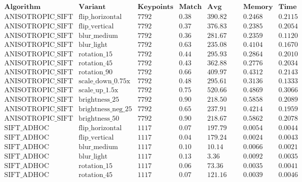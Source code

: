 \documentclass[conference]{IEEEtran}
\begin{document}
$$\begin{array}{|l|l|c|c|c|c|c|}
\hline
\textbf{Algorithm} & \textbf{Variant} & \textbf{Keypoints} & \textbf{Match Ratio} & \textbf{Avg Distance} & \textbf{Memory (MB)} & \textbf{Time (sec)} \\ \hline
\text{ANISOTROPIC\_SIFT} & \text{flip\_horizontal} & 7792 & 0.38 & 390.82 & 0.2468 & 0.2115 \\
\text{ANISOTROPIC\_SIFT} & \text{flip\_vertical} & 7792 & 0.37 & 376.83 & 0.2385 & 0.2054 \\
\text{ANISOTROPIC\_SIFT} & \text{blur\_medium} & 7792 & 0.36 & 281.67 & 0.2359 & 0.1120 \\
\text{ANISOTROPIC\_SIFT} & \text{blur\_light} & 7792 & 0.63 & 235.08 & 0.4104 & 0.1670 \\
\text{ANISOTROPIC\_SIFT} & \text{rotation\_15} & 7792 & 0.44 & 295.93 & 0.2864 & 0.2010 \\
\text{ANISOTROPIC\_SIFT} & \text{rotation\_45} & 7792 & 0.43 & 362.88 & 0.2776 & 0.2034 \\
\text{ANISOTROPIC\_SIFT} & \text{rotation\_90} & 7792 & 0.66 & 409.97 & 0.4312 & 0.2143 \\
\text{ANISOTROPIC\_SIFT} & \text{scale\_down\_0.75x} & 7792 & 0.48 & 295.61 & 0.3136 & 0.1333 \\
\text{ANISOTROPIC\_SIFT} & \text{scale\_up\_1.5x} & 7792 & 0.75 & 520.66 & 0.4869 & 0.3066 \\
\text{ANISOTROPIC\_SIFT} & \text{brightness\_25} & 7792 & 0.90 & 218.50 & 0.5858 & 0.2089 \\
\text{ANISOTROPIC\_SIFT} & \text{brightness\_neg\_25} & 7792 & 0.65 & 237.91 & 0.4214 & 0.1959 \\
\text{ANISOTROPIC\_SIFT} & \text{brightness\_50} & 7792 & 0.90 & 218.67 & 0.5862 & 0.2078 \\ \hline
\text{SIFT\_ADHOC} & \text{flip\_horizontal} & 1117 & 0.07 & 197.79 & 0.0054 & 0.0044 \\
\text{SIFT\_ADHOC} & \text{flip\_vertical} & 1117 & 0.04 & 179.24 & 0.0024 & 0.0043 \\
\text{SIFT\_ADHOC} & \text{blur\_medium} & 1117 & 0.10 & 10.14 & 0.0066 & 0.0021 \\
\text{SIFT\_ADHOC} & \text{blur\_light} & 1117 & 0.13 & 3.36 & 0.0092 & 0.0035 \\
\text{SIFT\_ADHOC} & \text{rotation\_15} & 1117 & 0.06 & 73.36 & 0.0035 & 0.0041 \\
\text{SIFT\_ADHOC} & \text{rotation\_45} & 1117 & 0.07 & 121.16 & 0.0039 & 0.0046 \\

\end{array}$$
\end{document}
